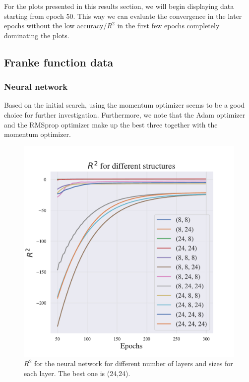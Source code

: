 For the plots presented in this results section, we will begin displaying data starting from epoch 50.
This way we can evaluate the convergence in the later epochs without the low accuracy/$R^2$ in the first few epochs completely dominating the plots.

\subsection{Franke function data}

\subsubsection{Neural network}

Based on the initial search, using the momentum optimizer seems to be a good choice for further investigation.
Furthermore, we note that the Adam optimizer and the RMSprop optimizer make up the best three together with the momentum optimizer.

\begin{figure}[h!]
    \centering
    \includegraphics[width=1.0\linewidth]{project_2/figures/$R^2$ for different structures_continuous.pdf}
    \caption{$R^2$ for the neural network for different number of layers and sizes for each layer. The best one is (24,24).}
    \label{fig:structure_franke}
\end{figure}

